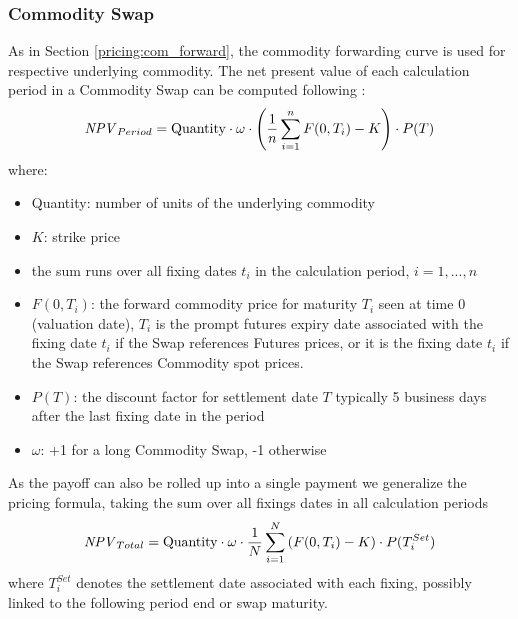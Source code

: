 \subsubsection{Commodity Swap}
\label{pricing:com_swap}

As in Section \ref{pricing:com_forward}, the commodity forwarding
curve is used for respective underlying commodity.
 The net present value of each calculation period in a Commodity Swap 
can be computed following \cite{Clark_2014}:
$$
\mathit{NPV}_{Period} = \mbox{Quantity}\cdot \omega\cdot \left(\frac{1}{n}\sum_{i=1}^n F(0,T_i) - K\right) \cdot P(T)
$$
where:
\begin{itemize}
\item Quantity: number of units of the underlying commodity
\item $K$: strike price
\item the sum runs over all fixing dates $t_i$ in the calculation
  period, $i=1, ..., n$
\item $F(0,T_i)$: the forward commodity price for maturity $T_i$ seen at
  time 0 (valuation date), $T_i$ is the prompt futures expiry date
  associated with the fixing date $t_i$ if the Swap references Futures
  prices, or it is the fixing date $t_i$ if the  Swap references
  Commodity spot prices.
\item $P(T)$: the discount factor for settlement date $T$ typically 5
  business days after the last fixing date in the period
\item $\omega$: +1 for a long Commodity Swap, -1 otherwise 
\end{itemize}

As the payoff can also be rolled up into a single payment we
generalize the pricing formula, taking the sum over all fixings dates
in all calculation periods
$$
\mathit{NPV}_{Total} = \mbox{Quantity}\cdot \omega\cdot \frac{1}{N}\sum_{i=1}^N\left( F(0,T_i) - K\right) \cdot P(T^{Set}_i)
$$
where $T^{Set}_i$ denotes the settlement date associated with each fixing,
possibly linked to the following period end or swap maturity.